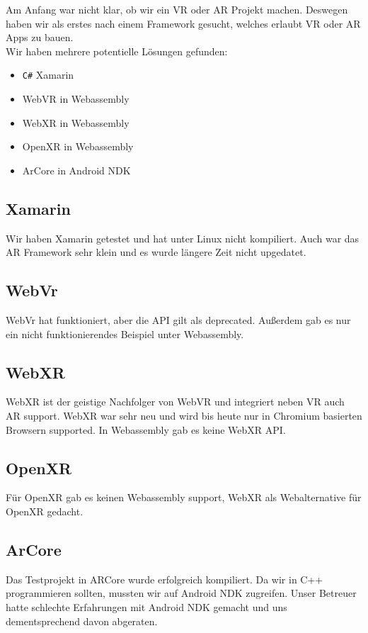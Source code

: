 Am Anfang war nicht klar, ob wir ein VR oder AR Projekt machen. Deswegen haben wir als erstes nach einem Framework gesucht, welches erlaubt VR oder AR Apps zu bauen.
\\
Wir haben mehrere potentielle Lösungen gefunden:

\begin{itemize}
  \item \verb|C#| Xamarin
  \item WebVR in Webassembly
  \item WebXR in Webassembly
  \item OpenXR in Webassembly
  \item ArCore in Android NDK
\end{itemize}

\subsection{Xamarin}
Wir haben Xamarin getestet und hat unter Linux nicht
kompiliert. Auch war das AR
Framework sehr klein und es wurde längere Zeit nicht upgedatet.

\subsection{WebVr}
WebVr hat funktioniert, aber die API gilt als deprecated.
Außerdem gab es nur ein nicht
funktionierendes Beispiel unter Webassembly.

\subsection{WebXR}
WebXR ist der geistige Nachfolger von WebVR und integriert neben VR auch AR support.
WebXR war sehr neu und wird bis heute nur in Chromium
basierten Browsern
supported. In Webassembly gab es keine WebXR API.

\subsection{OpenXR}
Für OpenXR gab es keinen Webassembly support, WebXR als Webalternative für OpenXR gedacht.

\subsection{ArCore}
Das Testprojekt in ARCore wurde erfolgreich kompiliert.
Da wir in C++ programmieren sollten, mussten wir auf Android NDK zugreifen.
Unser Betreuer hatte schlechte Erfahrungen mit Android NDK
gemacht und uns dementsprechend davon abgeraten.

